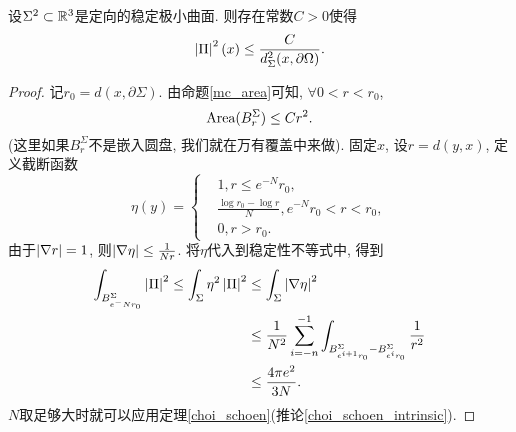 \begin{theorem}
    设$\Sigma^2 \subset \mathbb{R}^3$是定向的稳定极小曲面. 则存在常数$C>0$使得
    \begin{equation}
        \left | {\Pi} \right |^2(x) \le \frac{C}{d^2_\Sigma(x,\partial \Omega)}.
    \end{equation}
\end{theorem}
\begin{proof}
    记$r_0=d(x,\partial \Sigma)$. 由命题\eqref{mc_area}可知, $\forall 0<r < r_0$, 
    \begin{equation}
        \text{Area}(B^\Sigma_r) \le Cr^2.
    \end{equation}
    (这里如果$B^\Sigma_r$不是嵌入圆盘, 我们就在万有覆盖中来做). 固定$x$, 设$r=d(y,x)$, 定义截断函数
    \begin{equation}
        \eta(y)=\left\{
            \begin{aligned}
                & 1, r\le e^{-N}r_0, \\
                & \frac{\log r_0-\log r}{N}, e^{-N}r_0 < r < r_0, \\
                & 0, r>r_0.
            \end{aligned}
        \right.
    \end{equation}
    由于$\left | \nabla r \right |=1$, 则$\left | \nabla \eta \right | \le \frac{1}{Nr}$. 将$\eta$代入到稳定性不等式中, 得到
    \begin{equation}
        \begin{split}
            \int_{B^\Sigma_{e^-Nr_0}}\left | {\Pi} \right |^2 \le \int_\Sigma \eta^2 \left | {\Pi} \right |^2 &\le \int_\Sigma \left | \nabla \eta \right |^2  \\
            &\le \frac{1}{N^2}\sum_{i=-n}^{-1}\int_{B_{e^{i+1}r_0}^\Sigma-B_{e^ir_0}^\Sigma}\frac{1}{r^2} \\
            &\le \frac{4\pi e^2}{3N}.
        \end{split}
    \end{equation}
    $N$取足够大时就可以应用定理\eqref{choi_schoen}(推论\eqref{choi_schoen_intrinsic}).
\end{proof}